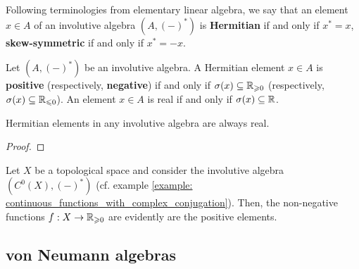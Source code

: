         \begin{definition} \label{def: hermitian_and_skew_symmetric_elements}
            Following terminologies from elementary linear algebra, we say that an element $x \in A$ of an involutive algebra $(A, (-)^*)$ is \textbf{Hermitian} if and only if $x^* = x$,  \textbf{skew-symmetric} if and only if $x^* = -x$.
        \end{definition}
        \begin{definition} \label{def: positivity_and_negativity}
            Let $(A, (-)^*)$ be an involutive algebra. A Hermitian element $x \in A$ is \textbf{positive} (respectively, \textbf{negative}) if and only if $\sigma(x) \subseteq \mathbb{R}_{\geqslant 0}$ (respectively, $\sigma(x) \subseteq \mathbb{R}_{\leqslant 0}$). An element $x \in A$ is real if and only if $\sigma(x) \subseteq \mathbb{R}$.
        \end{definition}
        \begin{proposition} \label{prop: hermitian_elements_are_real}
            Hermitian elements in any involutive algebra are always real.
        \end{proposition}
            \begin{proof}
                
            \end{proof}
        \begin{example}
            Let $X$ be a topological space and consider the involutive algebra $(C^0(X), (-)^*)$ (cf. example \ref{example: continuous_functions_with_complex_conjugation}). Then, the non-negative functions $f: X \to \mathbb{R}_{\geqslant 0}$ are evidently are the positive elements.
        \end{example}
            
        \begin{remark}
            
        \end{remark}

\subsection{von Neumann algebras}